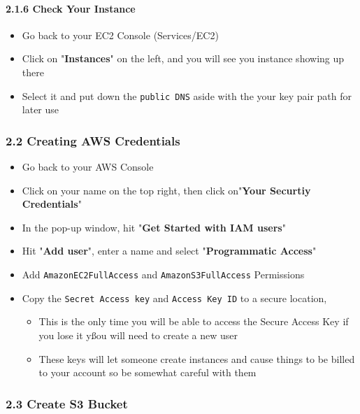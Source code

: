 \documentclass[]{article}
\let\oldparagraph\paragraph
\renewcommand{\paragraph}[1]{\oldparagraph{#1}\mbox{}}
\begin{document}
\hypertarget{header-n190}{%
\paragraph{2.1.6 Check Your Instance}\label{header-n190}}

\begin{itemize}
\item
  Go back to your EC2 Console (Services/EC2)
\item
  Click on "\textbf{Instances}" on the left, and you will see you
  instance showing up there
\item
  Select it and put down the \texttt{public\ DNS} aside with the your
  key pair path for later use
\end{itemize}

\hypertarget{header-n203}{%
\subsubsection{2.2 Creating AWS Credentials}\label{header-n203}}

\begin{itemize}
\item
  Go back to your AWS Console
\item
  Click on your name on the top right, then click on"\textbf{Your
  Securtiy Credentials}"
\item
  In the pop-up window, hit "\textbf{Get Started with IAM users}"
\item
  Hit "\textbf{Add user}", enter a name and select "\textbf{Programmatic
  Access}"
\item
  Add \texttt{AmazonEC2FullAccess} and \texttt{AmazonS3FullAccess}
  Permissions
\item
  Copy the \texttt{Secret\ Access\ key} and \texttt{Access\ Key\ ID} to
  a secure location,

  \begin{itemize}
  \item
    This is the only time you will be able to access the Secure Access
    Key if you lose it yßou will need to create a new user
  \item
    These keys will let someone create instances and cause things to be
    billed to your account so be somewhat careful with them
  \end{itemize}
\end{itemize}

\hypertarget{header-n232}{%
\subsubsection{2.3 Create S3 Bucket}\label{header-n232}}
\end{document}
